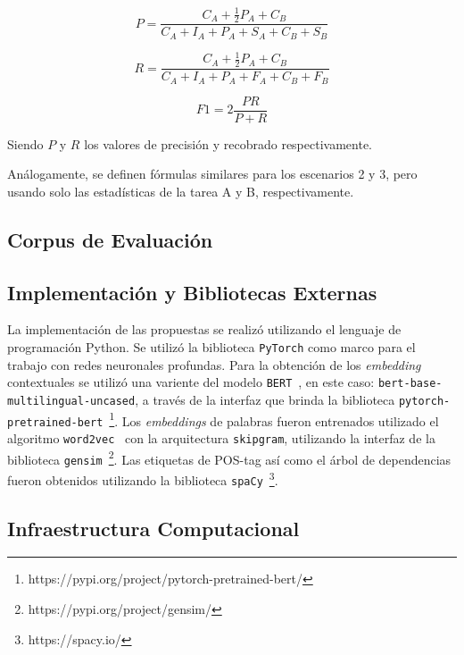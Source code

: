 \begin{equation*}
P = \frac{C_A + \frac{1}{2}P_A + C_B}{C_A + I_A + P_A + S_A + C_B + S_B}
\end{equation*}

\begin{equation*}
R = \frac{C_A + \frac{1}{2}P_A + C_B}{C_A + I_A + P_A + F_A + C_B + F_B}
\end{equation*}

\begin{equation*}
F1 = 2\frac{PR}{P+R}
\end{equation*}

Siendo $P$ y $R$ los valores de precisión y recobrado respectivamente.

Análogamente, se definen fórmulas similares para los escenarios 2 y 3, pero usando solo las estadísticas de la tarea A y B, respectivamente.

\subsection{Corpus de Evaluación}


\subsection{Implementación y Bibliotecas Externas}

La implementación de las propuestas se realizó utilizando el lenguaje de programación Python.
Se utilizó la biblioteca \texttt{PyTorch} como marco para el trabajo con redes neuronales profundas.
Para la obtención de los \textit{embedding} contextuales se utilizó una variente del modelo \texttt{BERT}~\cite{devlin2018bert}, en este caso: \texttt{bert-base-multilingual-uncased}, a través de la interfaz que brinda la biblioteca \texttt{pytorch-pretrained-bert}~\footnote{https://pypi.org/project/pytorch-pretrained-bert/}.
Los \textit{embeddings} de palabras fueron entrenados utilizado el algoritmo \texttt{word2vec}~\cite{mikolov2013efficient} con la arquitectura \texttt{skipgram}, utilizando la interfaz de la biblioteca \texttt{gensim}~\footnote{https://pypi.org/project/gensim/}.
Las etiquetas de POS-tag así como el árbol de dependencias fueron obtenidos utilizando la biblioteca \texttt{spaCy}~\footnote{https://spacy.io/}.

\subsection{Infraestructura Computacional}


